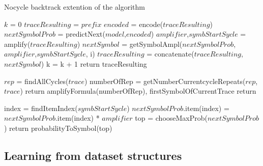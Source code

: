 \begin{algorithm}
	\caption{Nocycle backtrack extention of the algorithm}\label{AIPal}
	\begin{algorithmic}[1]
		\State $k$ = 0
		\State $traceResulting$ = $prefix$
		\Do
		\State $encoded$ = encode($traceResulting$)
		\State $nextSymbolProb$ = predictNext($model$,$encoded$)
		\State $amplifier$,$symbStartSycle$ = amplify($traceResulting$)
		\State {}
		\State $nextSymbol$ = getSymbolAmpl($nextSymbolProb$, $amplifier$,$symbStartSycle$, i)
		\State $traceResulting$ = concatenate($traceResulting$, $nextSymbol$)
		\State k = k + 1  
		\State return traceResulting
		\EndFunction
		
		\State $rep$ = findAllCycles($trace$)
		\State {} {
			\State numberOfRep = getNumberCurrentcycleRepeats($rep$,$trace$)
			\State return amplifyFormula(numberOfRep), firstSymbolOfCurrentTrace}
		\State return 
		\EndFunction
		
		\State index = findItemIndex($symbStartSycle$)
		\State $nextSymbolProb$.item(index) = $nextSymbolProb$.item(index) * $amplifier$
		\State top = chooseMaxProb($nextSymbolProb$)
		\State return probabilityToSymbol(top)
		\EndFunction
	\end{algorithmic}
\end{algorithm}




\subsection{Learning from dataset structures}
\label{ssec:noloop}

